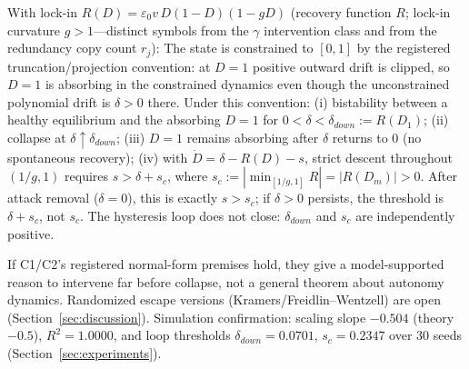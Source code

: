 \begin{proposition}\label{prop:c2}
With lock-in $R(D)=\varepsilon_0 v\,D(1-D)(1-gD)$ (recovery function $R$;
lock-in curvature $g>1$---distinct symbols from the $\gamma$ intervention
class and from the redundancy copy count $r_j$):
The state is constrained to $[0,1]$ by the registered truncation/projection
convention: at $D=1$ positive outward drift is clipped, so $D=1$ is absorbing
in the constrained dynamics even though the unconstrained polynomial drift is
$\delta>0$ there. Under this convention:
\textup{(i)} bistability between a healthy equilibrium and the absorbing
$D=1$ for $0<\delta<\delta_{down}:=R(D_1)$; \textup{(ii)} collapse at
$\delta\uparrow\delta_{down}$; \textup{(iii)} $D=1$ remains absorbing after
$\delta$ returns to $0$ (no spontaneous recovery); \textup{(iv)} with
$\dot D=\delta-R(D)-s$, strict descent throughout $(1/g,1)$ requires
$s>\delta+s_c$, where $s_c:=|\min_{[1/g,1]}R|=|R(D_m)|>0$. After attack
removal ($\delta=0$), this is exactly $s>s_c$; if $\delta>0$ persists, the
threshold is $\delta+s_c$, not $s_c$. The hysteresis loop does not close:
$\delta_{down}$ and $s_c$ are independently positive.
\end{proposition}

If C1/C2's registered normal-form premises hold, they give a model-supported
reason to intervene far before collapse, not a general theorem about autonomy
dynamics. Randomized escape versions
(Kramers/Freidlin--Wentzell) are open (Section~\ref{sec:discussion}).
Simulation confirmation: scaling slope $-0.504$ (theory $-0.5$), $R^2=1.0000$,
and loop thresholds $\delta_{down}=0.0701$, $s_c=0.2347$ over 30 seeds
(Section~\ref{sec:experiments}).
